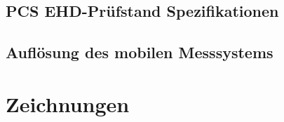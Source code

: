 \begin{appendices}
    \section{PCS EHD-Prüfstand Spezifikationen}
    

    \section{Auflösung des mobilen Messsystems}
    \label{sec:aufloesung_des_mobilen_messsystems}

    \chapter{Zeichnungen}

\end{appendices}
